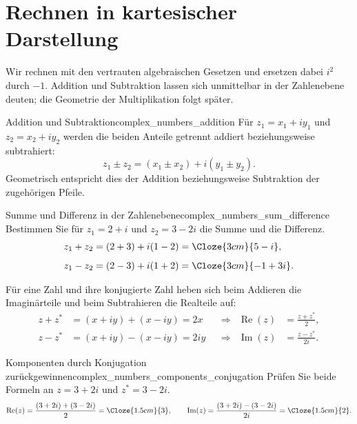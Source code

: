 \section{Rechnen in kartesischer Darstellung}
\label{sec:complex_numbers_cartesian_arithmetic}
Wir rechnen mit den vertrauten algebraischen Gesetzen und ersetzen dabei
$i^2$ durch $-1$. Addition und Subtraktion lassen sich unmittelbar in der
Zahlenebene deuten; die Geometrie der Multiplikation folgt später.

\begin{KeyPointBox}{Addition und Subtraktion}{complex_numbers_addition}
  Für $z_1=x_1+iy_1$ und $z_2=x_2+iy_2$ werden die beiden Anteile
  getrennt addiert beziehungsweise subtrahiert:
  \[
    z_1\pm z_2=(x_1\pm x_2)+i(y_1\pm y_2).
  \]
  Geometrisch entspricht dies der Addition beziehungsweise Subtraktion
  der zugehörigen Pfeile.
\end{KeyPointBox}
\begin{ExampleBox}{Summe und Differenz in der Zahlenebene}{complex_numbers_sum_difference}
  Bestimmen Sie für $z_1=2+i$ und $z_2=3-2i$ die Summe und die Differenz.
  \[
    \begin{aligned}
      z_1+z_2&=(2+3)+i(1-2)=\Cloze{3cm}{5-i},\\[5pt]
      z_1-z_2&=(2-3)+i(1+2)=\Cloze{3cm}{-1+3i}.
    \end{aligned}
  \]
  \begin{center}
  \end{center}
\end{ExampleBox}
\clearpage
Für eine Zahl und ihre konjugierte Zahl heben sich beim Addieren die
Imaginärteile und beim Subtrahieren die Realteile auf:
\[
  \begin{aligned}
    z+z^*&=(x+iy)+(x-iy)=2x
      &&\Longrightarrow& \operatorname{Re}(z)&=\frac{z+z^*}{2},\\[6pt]
    z-z^*&=(x+iy)-(x-iy)=2iy
      &&\Longrightarrow& \operatorname{Im}(z)&=\frac{z-z^*}{2i}.
  \end{aligned}
\]
\begin{ExampleBox}{Komponenten durch Konjugation zurückgewinnen}{complex_numbers_components_conjugation}
  Prüfen Sie beide Formeln an $z=3+2i$ und $z^*=3-2i$.
  \[
    \operatorname{Re}(z)=\frac{(3+2i)+(3-2i)}2=\Cloze{1.5cm}{3},\qquad
    \operatorname{Im}(z)=\frac{(3+2i)-(3-2i)}{2i}=\Cloze{1.5cm}{2}.
  \]
\end{ExampleBox}

